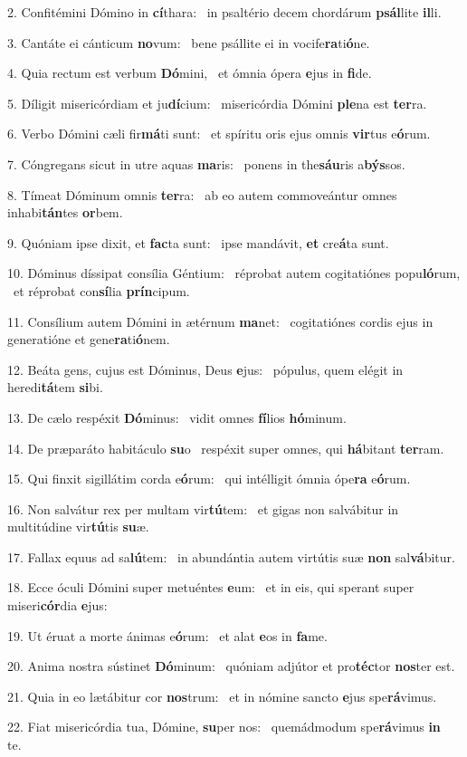 2. Confitémini Dómino in \textbf{cí}thara: \ast\  in psaltério decem chordárum \textbf{psál}lite \textbf{il}li.\

3. Cantáte ei cánticum \textbf{no}vum: \ast\  bene psállite ei in vocife\textbf{ra}ti\textbf{ó}ne.\

4. Quia rectum est verbum \textbf{Dó}mini, \ast\  et ómnia ópera \textbf{e}jus in \textbf{fi}de.\

5. Díligit misericórdiam et ju\textbf{dí}cium: \ast\  misericórdia Dómini \textbf{ple}na est \textbf{ter}ra.\

6. Verbo Dómini cæli fir\textbf{má}ti sunt: \ast\  et spíritu oris ejus omnis \textbf{vir}tus e\textbf{ó}rum.\

7. Cóngregans sicut in utre aquas \textbf{ma}ris: \ast\  ponens in the\textbf{sáu}ris a\textbf{býs}sos.\

8. Tímeat Dóminum omnis \textbf{ter}ra: \ast\  ab eo autem commoveántur omnes inhabi\textbf{tán}tes \textbf{or}bem.\

9. Quóniam ipse dixit, et \textbf{fac}ta sunt: \ast\  ipse mandávit, \textbf{et} cre\textbf{á}ta sunt.\

10. Dóminus díssipat consília Géntium: \dag\  réprobat autem cogitatiónes popu\textbf{ló}rum, \ast\  et réprobat con\textbf{sí}lia \textbf{prín}cipum.\

11. Consílium autem Dómini in ætérnum \textbf{ma}net: \ast\  cogitatiónes cordis ejus in generatióne et gene\textbf{ra}ti\textbf{ó}nem.\

12. Beáta gens, cujus est Dóminus, Deus \textbf{e}jus: \ast\  pópulus, quem elégit in heredi\textbf{tá}tem \textbf{si}bi.\

13. De cælo respéxit \textbf{Dó}minus: \ast\  vidit omnes \textbf{fí}lios \textbf{hó}minum.\

14. De præparáto habitáculo \textbf{su}o \ast\  respéxit super omnes, qui \textbf{há}bitant \textbf{ter}ram.\

15. Qui finxit sigillátim corda e\textbf{ó}rum: \ast\  qui intélligit ómnia ópe\textbf{ra} e\textbf{ó}rum.\

16. Non salvátur rex per multam vir\textbf{tú}tem: \ast\  et gigas non salvábitur in multitúdine vir\textbf{tú}tis \textbf{su}æ.\

17. Fallax equus ad sa\textbf{lú}tem: \ast\  in abundántia autem virtútis suæ \textbf{non} sal\textbf{vá}bitur.\

18. Ecce óculi Dómini super metuéntes \textbf{e}um: \ast\  et in eis, qui sperant super miseri\textbf{cór}dia \textbf{e}jus:\

19. Ut éruat a morte ánimas e\textbf{ó}rum: \ast\  et alat \textbf{e}os in \textbf{fa}me.\

20. Anima nostra sústinet \textbf{Dó}minum: \ast\  quóniam adjútor et pro\textbf{téc}tor \textbf{nos}ter est.\

21. Quia in eo lætábitur cor \textbf{nos}trum: \ast\  et in nómine sancto \textbf{e}jus spe\textbf{rá}vimus.\

22. Fiat misericórdia tua, Dómine, \textbf{su}per nos: \ast\  quemádmodum spe\textbf{rá}vimus \textbf{in} te.\

